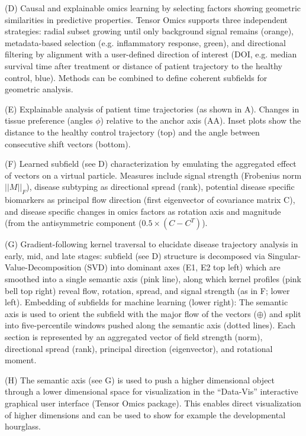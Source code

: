 \vspace{0.5cm}
(D) Causal and explainable omics learning by selecting factors showing geometric similarities in predictive properties. Tensor Omics supports three independent strategies: radial subset growing until only background signal remains (orange), metadata-based selection (e.g. inflammatory response, green), and directional filtering by alignment with a user-defined direction of interest (DOI, e.g. median survival time after treatment or distance of patient trajectory to the healthy control, blue). Methods can be combined to define coherent subfields for geometric analysis.

\vspace{0.5cm}
(E) Explainable analysis of patient time trajectories (as shown in A). Changes in tissue preference (angles $\phi$) relative to the anchor axis (AA). Inset plots show the distance to the healthy control trajectory (top) and the angle between consecutive shift vectors (bottom).

\vspace{0.5cm}
(F) Learned subfield (see D) characterization by emulating the aggregated effect of vectors on a virtual particle. Measures include signal strength (Frobenius norm $||M||_F$), disease subtyping as directional spread (rank), potential disease specific biomarkers as principal flow direction (first eigenvector of covariance matrix C), and disease specific changes in omics factors as rotation axis and magnitude (from the antisymmetric component ($0.5 \times (C - C^T)$).

\vspace{0.5cm}
(G) Gradient-following kernel traversal to elucidate disease trajectory analysis in early, mid, and late stages: subfield (see D) structure is decomposed via Singular-Value-Decomposition (SVD) into dominant axes (E1, E2 top left) which are smoothed into a single semantic axis (pink line), along which kernel profiles (pink bell top right) reveal flow, rotation, spread, and signal strength (as in F; lower left). Embedding of subfields for machine learning (lower right): The semantic axis is used to orient the subfield with the major flow of the vectors ($\oplus$) and split into five-percentile windows pushed along the semantic axis (dotted lines). Each section is represented by an aggregated vector of field strength (norm), directional spread (rank), principal direction (eigenvector), and rotational moment.

\vspace{0.5cm}
(H) The semantic axis (see G) is used to push a higher dimensional object through a lower dimensional space for visualization in the ``Data-Vis'' interactive graphical user interface (Tensor Omics package). This enables direct visualization of higher dimensions and can be used to show for example the developmental hourglass.

